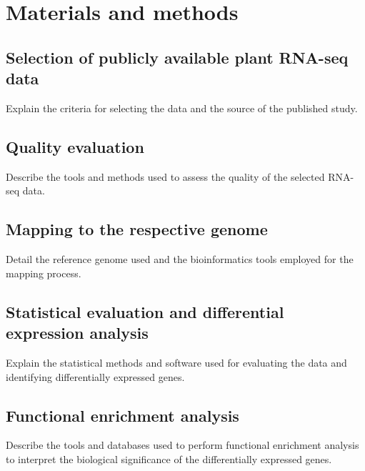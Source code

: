 \section{Materials and methods}

\subsection{Selection of publicly available plant RNA-seq data}
Explain the criteria for selecting the data and the source of the published study.

\subsection{Quality evaluation}
Describe the tools and methods used to assess the quality of the selected RNA-seq data.

\subsection{Mapping to the respective genome}
Detail the reference genome used and the bioinformatics tools employed for the mapping process.

\subsection{Statistical evaluation and differential expression analysis}
Explain the statistical methods and software used for evaluating the data and identifying differentially expressed genes.

\subsection{Functional enrichment analysis}
Describe the tools and databases used to perform functional enrichment analysis to interpret the biological significance of the differentially expressed genes.